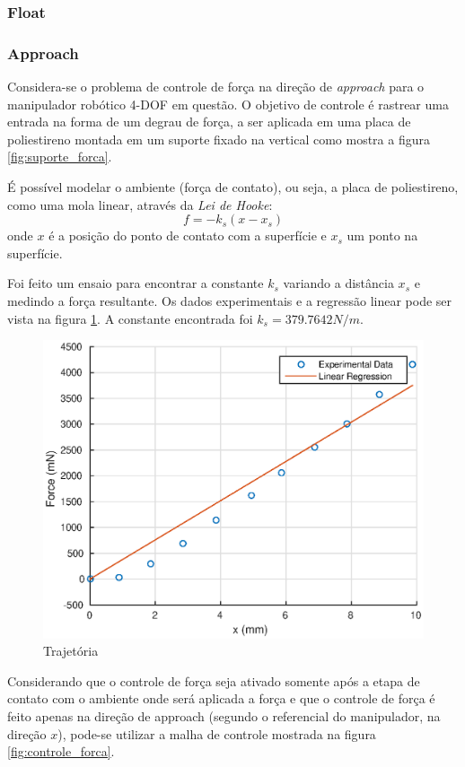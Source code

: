\subsubsection{Float}

\subsubsection{Approach}
Considera-se o problema de controle de força na direção de \textit{approach} para o manipulador robótico 4-DOF em questão. O objetivo de controle é rastrear uma entrada na forma de um degrau de força, a ser aplicada em uma placa de poliestireno montada em um suporte fixado na vertical como mostra a figura \ref{fig:suporte_forca}.  

É possível modelar o ambiente (força de contato), ou seja, a placa de poliestireno, como uma mola linear, através da \textit{Lei de Hooke}\cite{leite2011servo}: 
\begin{equation}
f = -k_s (x - x_s)
\end{equation}
onde $x$ é a posição do ponto de contato com a superfície e $x_s$ um ponto na superfície.

Foi feito um ensaio para encontrar a constante $k_s$ variando a distância $x_s$ e medindo a força resultante. Os dados experimentais e a regressão linear pode ser vista na figura \ref{fig:ks_linreg}. A constante encontrada foi $k_s = 379.7642 N/m$.

\begin{figure}[!ht]
\centering
  \includegraphics[width=0.5\linewidth]{./img/ks_estimation.eps}
  \caption{Trajetória}
  \label{fig:ks_linreg}
\end{figure}%


Considerando que o controle de força seja ativado somente após a etapa de contato com o ambiente onde será aplicada a força e que o controle de força é feito apenas na direção de approach (segundo o referencial do manipulador, na direção $x$), pode-se utilizar a malha de controle mostrada na figura \ref{fig:controle_forca}.

